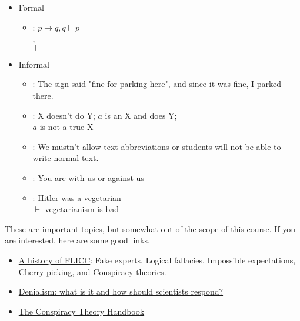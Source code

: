 \documentclass[headrule,footrule]{foils}
\begin{document}
\begin{itemize}
\item Formal
  \begin{itemize}
  \item {}: $p \rightarrow q, q \vdash p$
    \\ , 
    \\ $\vdash$ 
  \end{itemize}
\item Informal
  \begin{itemize}
  \item {}:  The sign said "fine for parking here", and since it was fine, I parked there. 
  \item {}: X doesn't do Y; $a$ is an X and does Y;
    \\ $a$ is not a true X
  \item {}: We mustn't allow text abbreviations or students will not be able to write normal text.
  \item {}: You are with us or against us
  \item {}: Hitler was a vegetarian \\
    $\vdash$ vegetarianism is bad
  \end{itemize}
\end{itemize}


These are important topics, but somewhat out of the scope of this
course.  If you are interested, here are some good links.

\begin{itemize}
\item
  \href{https://crankyuncle.com/a-history-of-flicc-the-5-techniques-of-science-denial/}{A
    history of FLICC}: Fake experts, Logical fallacies, Impossible expectations, Cherry picking, and Conspiracy theories.
  
\item \href{https://academic.oup.com/eurpub/article/19/1/2/463780}{Denialism: what is it and how should scientists respond?}
\item \href{https://www.climatechangecommunication.org/conspiracy-theory-handbook/}{The Conspiracy Theory Handbook}
\end{itemize}
\end{document}
